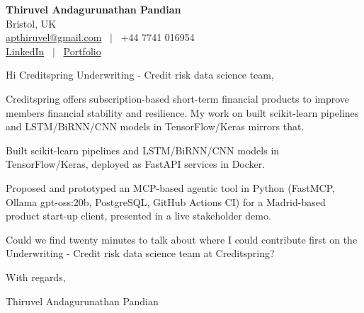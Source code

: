 \documentclass[11pt,a4paper]{article}
\begin{document}
\raggedright
\pagestyle{empty}

\begin{center}
    {\LARGE \color{linkblue} \textbf{Thiruvel Andagurunathan Pandian}}\\[0.2cm]
    Bristol, UK \\
    \href{mailto:apthiruvel@gmail.com}{apthiruvel@gmail.com} \ $|$ \ +44 7741 016954 \\
\href{https://www.linkedin.com/in/thiruvel-a-p/}{LinkedIn} \ $|$ \ \href{https://thiruvel-ap.github.io/PersonalPortfolio/}{Portfolio}
\end{center}

\vspace{0.4cm}

\noindent
Hi Creditspring Underwriting - Credit risk data science team,

Creditspring offers subscription-based short-term financial products to improve members\textquotesingle{} financial stability and resilience. My work on built scikit-learn pipelines and LSTM/BiRNN/CNN models in TensorFlow/Keras mirrors that.

Built scikit-learn pipelines and LSTM/BiRNN/CNN models in TensorFlow/Keras, deployed as FastAPI services in Docker.

Proposed and prototyped an MCP-based agentic tool in Python (FastMCP, Ollama gpt-oss:20b, PostgreSQL, GitHub Actions CI) for a Madrid-based product start-up client, presented in a live stakeholder demo.

Could we find twenty minutes to talk about where I could contribute first on the Underwriting - Credit risk data science team at Creditspring?

\vspace{0.5cm}

With regards,

Thiruvel Andagurunathan Pandian
\end{document}
